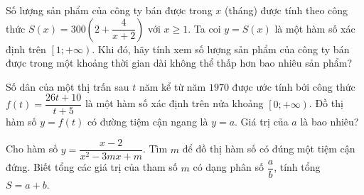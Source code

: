 \begin{bt}%
	Số lượng sản phẩm của công ty bán được trong $x$ (tháng)  được tính theo công thức
	$S(x)=300\left(2+\dfrac{4}{x+2}\right)$ với $x\ge 1$. Ta coi $y=S(x)$ là một hàm số xác định trên $\left[1; +\infty\right)$. Khi đó, hãy tính xem  số lượng sản phẩm của công ty bán được trong một khoảng thời gian dài không thể thấp hơn bao nhiêu sản phẩm?
\end{bt}

\begin{bt}%
	Số dân của một thị trấn sau $t$ năm  kể từ năm $1970$ được ước tính bởi công thức $f(t)=\dfrac{26t+10}{t+5}$ là một hàm số xác định trên nửa khoảng $\left[0;+\infty\right)$. Đồ thị hàm số $y=f(t)$ có đường tiệm cận ngang là $y=a$. Giá trị của $a$ là bao nhiêu?
\end{bt}

\begin{bt}%
	Cho hàm số $y=\dfrac{x-2}{x^2-3mx+m}$. Tìm $m$ để  đồ thị hàm số có đúng một tiệm cận đứng. Biết tổng các giá trị của tham số $m$ có dạng phân số $\dfrac{a}{b}$, tính tổng $S=a+b$.
\end{bt}


